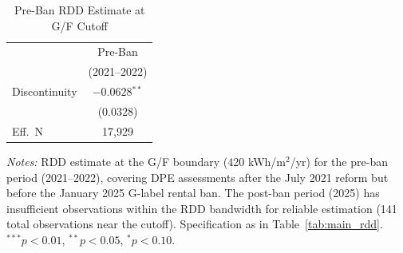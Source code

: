 \begin{table}[htbp]
\centering
\caption{Pre-Ban RDD Estimate at G/F Cutoff}
\label{tab:prepost}
\begin{tabular}{l c}
\hline\hline
 & Pre-Ban \\
 & (2021--2022) \\
\hline
Discontinuity & $-0.0628$$^{**}$ \\
 & ($0.0328$) \\
\hline
Eff.\ N & 17,929 \\
\hline\hline
\end{tabular}
\begin{minipage}{0.7\textwidth}
\small\textit{Notes:} RDD estimate at the G/F boundary (420 kWh/m$^2$/yr) for the pre-ban period (2021--2022), covering DPE assessments after the July 2021 reform but before the January 2025 G-label rental ban. The post-ban period (2025) has insufficient observations within the RDD bandwidth for reliable estimation (141 total observations near the cutoff). Specification as in Table~\ref{tab:main_rdd}. $^{***}p<0.01$, $^{**}p<0.05$, $^{*}p<0.10$.
\end{minipage}
\end{table}
